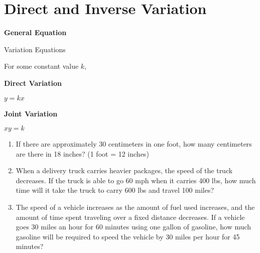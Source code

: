 \section[Variation]{Direct and Inverse Variation}

\bigskip
\textbf{General Equation}

\bigskip
\begin{equationbox}{Variation Equations}
\setlength{\columnseprule}{0pt}

For some constant value $k$,

\begin{center}
\begin{multicols}{2}
\textbf{Direct Variation}

$y=kx$

\columnbreak
\textbf{Joint Variation}

$xy=k$
\end{multicols}
\end{center}
\end{equationbox}

\bigskip
\begin{enumerate}[labelindent=*,style=multiline,leftmargin=*,label=\textbf{Example \arabic*:}]
\item If there are approximately 30 centimeters in one foot, how many centimeters are there in 18 inches? (1 foot = 12 inches)

\vfill
\item When a delivery truck carries heavier packages, the speed of the truck decreases. If the truck is able to go 60 mph when it carries 400 lbs, how much time will it take the truck to carry 600 lbs and travel 100 miles?

\vfill
\item The speed of a vehicle increases as the amount of fuel used increases, and the amount of time spent traveling over a fixed distance decreases. If a vehicle goes 30 miles an hour for 60 minutes using one gallon of gasoline, how much gasoline will be required to speed the vehicle by 30 miles per hour for 45 minutes?
\end{enumerate}

